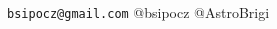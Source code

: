 \documentclass[10pt]{article}
\begin{document}
\begin{myposter}
\begin{myshadowfixed}{375.3mm}{60mm}
\begin{center}
\begin{minipage}[c]{290mm}
\begin{center}
	{\fontsize{30}{50}\selectfont{ \sc	Brigitta M.~Sip\H ocz \& the
      Astropy Collaboration} \Huge
      \texttt{bsipocz@gmail.com}
     @bsipocz
    @AstroBrigi}


\end{center}
\end{minipage}
\end{center}
\end{myshadowfixed}
\end{myposter}
\end{document}
